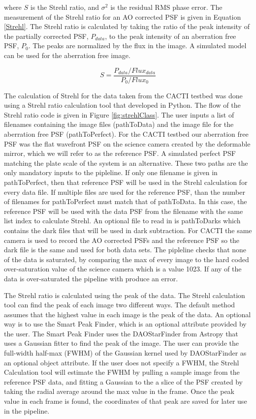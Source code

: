 \documentclass[12pt]{spieman}  %
\begin{document}
\begin{spacing}{2}
where $S$ is the Strehl ratio, and $\sigma^2$ is the residual RMS phase error. The measurement of the Strehl ratio for an AO corrected PSF is given in Equation \ref{Strehl}. The Strehl ratio is calculated by taking the ratio of the peak intensity of the partially corrected PSF, $P_{data}$,  to the peak intensity of an aberration free PSF, $P_0$. The peaks are normalized by the flux in the image. A simulated model can be used for the aberration free image. 

\begin{equation}
    S=\frac{P_{data}/Flux_{data}}{P_{0}/Flux_{0}}
    \label{Strehl}
\end{equation}

The calculation of Strehl for the data taken from the CACTI testbed was done using a Strehl ratio calculation tool that developed in Python. The flow of the Strehl ratio code is given in Figure \ref{fig:strehlClass}. The user inputs a list of filenames containing the image files (pathToData) and the image file for the aberration free PSF (pathToPerfect). For the CACTI testbed our aberration free PSF was the flat wavefront PSF on the science camera created by the deformable mirror, which we will refer to as the reference PSF. A simulated perfect PSF matching the plate scale of the system is an alternative. These two paths are the only mandatory inputs to the pipleline. If only one filename is given in pathToPerfect, then that reference PSF will be used in the Strehl calculation for every data file. If multiple files are used for the reference PSF, than the number of filenames for pathToPerfect must match that of pathToData. In this case, the reference PSF will be used with the data PSF from the filename with the same list index to calculate Strehl. An optional file to read in is pathToDarks which contains the dark files that will be used in dark subtraction. For CACTI the same camera is used to record the AO corrected PSFs and the reference PSF so the dark file is the same and used for both data sets. The pipleline checks that none of the data is saturated, by comparing the max of every image to the hard coded over-saturation value of the science camera which is a value 1023. If any of the data is over-saturated the pipeline with produce an error.

The Strehl ratio is calculated using the peak of the data. The Strehl calculation tool can find the peak of each image two different ways. The default method assumes that the highest value in each image is the peak of the data. An optional way is to use the Smart Peak Finder, which is an optional attribute provided by the user. The Smart Peak Finder uses the DAOStarFinder from Astropy that uses a Gaussian fitter to find the peak of the image. The user can provide the full-width half-max (FWHM) of the Gaussian kernel used by DAOStarFinder as an optional object attribute. If the user does not specify a FWHM, the Strehl Calculation tool will estimate the FWHM by pulling a sample image from the reference PSF data, and fitting a Gaussian to the a slice of the PSF created by taking the radial average around the max value in the frame. Once the peak value in each frame is found, the coordinates of that peak are saved for later use in the pipeline. 


\end{spacing}
\end{document}
